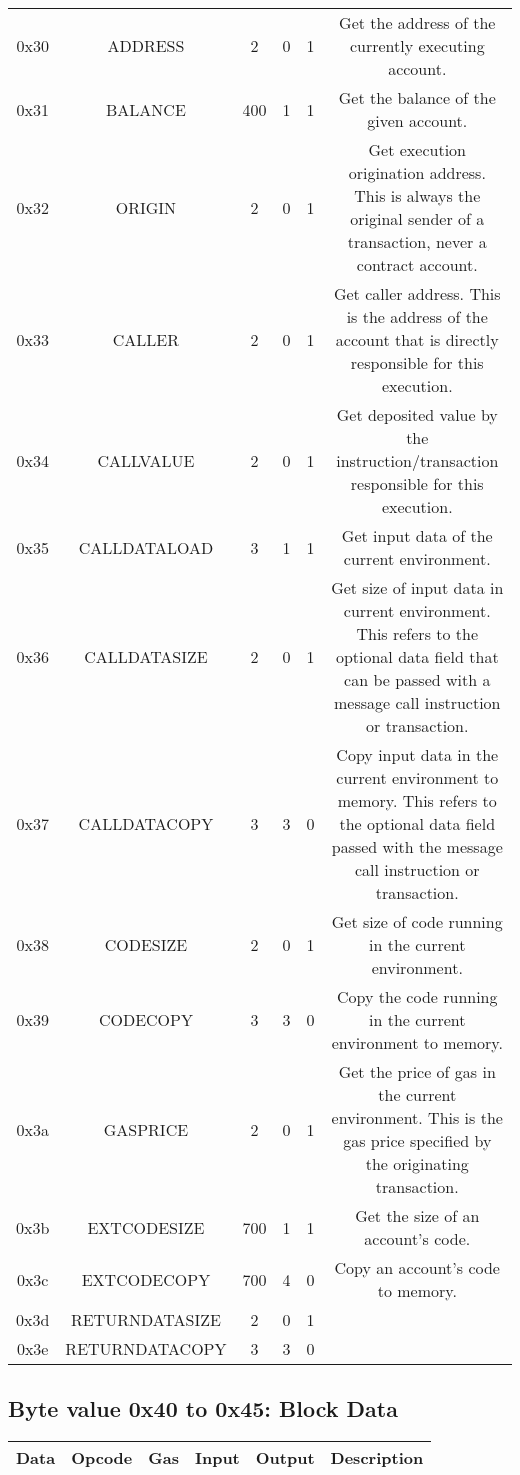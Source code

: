 \documentclass[10pt,a4paper,leqno,bibliography=totoc]{scrartcl}
\newenvironment{alphafootnotes}
{\par\edef\savedfootnotenumber{\number\value{footnote}}
\renewcommand{\thefootnote}{\alph{footnote}}
\setcounter{footnote}{0}}
{\par\setcounter{footnote}{\savedfootnotenumber}}
\begin{document}
\begin{alphafootnotes}
\begin{longtable}{|cccccc|}
	0x30 & ADDRESS & 2 & 0 & 1 & Get the address of the currently executing account. \\
	0x31 & BALANCE & 400 & 1 & 1 & Get the balance of the given account. \\
	0x32 & ORIGIN & 2 & 0 & 1 & Get execution origination address. This is always the original sender of a transaction, never a contract account. \\
	0x33 & CALLER & 2 & 0 & 1 & Get caller address. This is the address of the account that is directly responsible for this execution. \\
	0x34 & CALLVALUE & 2 & 0 & 1 & Get deposited value by the instruction/transaction responsible for this execution. \\
	0x35 & CALLDATALOAD & 3 & 1 & 1 & Get input data of the current environment. \\
	0x36 & CALLDATASIZE & 2 & 0 & 1 & Get size of input data in current environment. This refers to the optional data field that can be passed with a message call instruction or transaction.\\
	0x37 & CALLDATACOPY & 3 & 3 & 0 & Copy input data in the current environment to memory. This refers to the optional data field passed with the message call instruction or transaction. \\
	0x38 & CODESIZE & 2 & 0 & 1 & Get size of code running in the current environment. \\
	0x39 & CODECOPY & 3 & 3 & 0 & Copy the code running in the current environment to memory. \\
	0x3a & GASPRICE & 2 & 0 & 1 & Get the price of gas in the current environment. This is the gas price specified by the originating transaction. \\
	0x3b & EXTCODESIZE & 700 & 1 & 1 & Get the size of an account's code. \\
	0x3c & EXTCODECOPY & 700 & 4 & 0 & Copy an account's code to memory. \\
	0x3d & RETURNDATASIZE & 2 & 0 & 1 & \\
	0x3e & RETURNDATACOPY & 3 & 3 & 0 & \\

	\hline
\end{longtable}

        \subsection{Byte value 0x40 to 0x45: Block Data}
	\begin{longtable}{|cccccc|}
	\hline
	\textbf{Data} & \textbf{Opcode} & \textbf{Gas}  & \textbf{Input}  & \textbf{Output} & \textbf{Description} \\
	\hline


\end{longtable}
\end{alphafootnotes}
\end{document}
